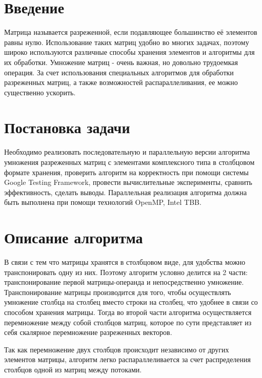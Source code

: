 \documentclass{report}
\begin{document}
\setcounter{page}{2}

\tableofcontents
\newpage

\section*{Введение}
\par Матрица называется разреженной, если подавляющее большинство её элементов равны нулю. Использование таких матриц удобно во многих задачах, поэтому широко используются различные способы хранения элементов и алгоритмы для их обработки. Умножение матриц - очень важная, но довольно трудоемкая операция. За счет использования специальных алгоритмов для обработки разреженных матриц, а также возможностей распараллеливания, ее можно существенно ускорить.
\newpage

\section*{Постановка задачи}
\par Необходимо реализовать последовательную и параллельную версии алгоритма умножения разреженных матриц с элементами комплексного типа в столбцовом формате хранения, проверить алгоритм на корректность при помощи системы Google Testing Framework, провести вычислительные эксперименты, сравнить эффективность, сделать выводы. Параллельная реализация алгоритма должна быть выполнена при помощи технологий OpenMP, Intel TBB.
\newpage

\section*{Описание алгоритма}
\par В связи с тем что матрицы хранятся в столбцовом виде, для удобства можно транспонировать одну из них. Поэтому алгоритм условно делится на 2 части: транспонирование первой матрицы-операнда и непосредственно умножение. Транспонирование матрицы производится для того, чтобы осуществлять умножение столбца на столбец вместо строки на столбец, что удобнее в связи со способом хранения матрицы. Тогда во второй части алгоритма осуществляется перемножение между собой столбцов матриц, которое по сути представляет из себя скалярное перемножение разреженных векторов.

\par Так как перемножение двух столбцов происходит независимо от других элементов матрицы, алгоритм легко распараллеливается за счет распределения столбцов одной из матриц между потоками.
\end{document}
